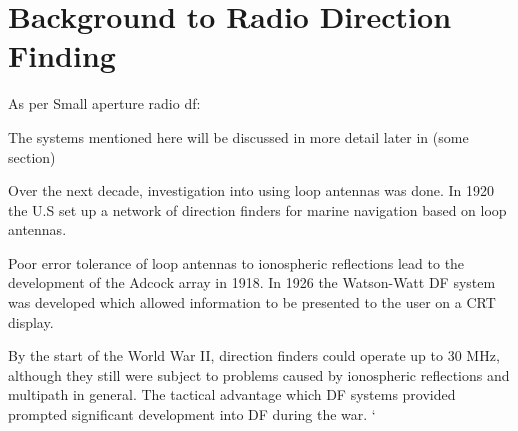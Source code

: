 \chapter{Background to Radio Direction Finding}
As per Small aperture radio df:

The systems mentioned here will be discussed in more detail later in (some section)



Over the next decade, investigation into using loop antennas was done. In 1920 the U.S set up a network of direction finders for marine navigation based on loop antennas.

Poor error tolerance of loop antennas to ionospheric reflections lead to the development of the Adcock array in 1918. 
In 1926 the Watson-Watt DF system was developed which allowed information to be presented to the user on a CRT display. 

By the start of  the World War II, direction finders could operate up to 30 MHz, although they still were subject to problems caused by ionospheric reflections and multipath in general. 
The tactical advantage which DF systems provided prompted significant development into DF during the war. `

